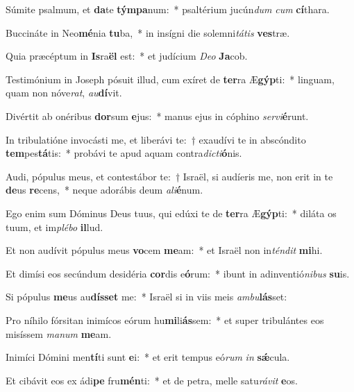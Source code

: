 \item Súmite psalmum, et \textbf{da}te \textbf{tým}\textbf{pa}num:~* psaltérium jucún\textit{dum} \textit{cum} \textbf{cí}thara.
\item Buccináte in Neo\textbf{mé}nia \textbf{tu}ba,~* in insígni die solemni\textit{tá}\textit{tis} \textbf{ves}træ.
\item Quia præcéptum in \textbf{Is}ra\textbf{ël} est:~* et judícium \textit{De}\textit{o} \textbf{Ja}cob.
\item Testimónium in Joseph pósuit illud, cum exíret de \textbf{ter}ra Æ\textbf{gýp}ti:~* linguam, quam non nóve\textit{rat}, \textit{au}\textbf{dí}vit.
\item Divértit ab onéribus \textbf{dor}sum \textbf{e}jus:~* manus ejus in cóphino \textit{ser}\textit{vi}\textbf{é}runt.
\item In tribulatióne invocásti me, et liberávi te:~† exaudívi te in abscóndito \textbf{tem}pes\textbf{tá}tis:~* probávi te apud aquam contra\textit{dic}\textit{ti}\textbf{ó}nis.
\item Audi, pópulus meus, et contestábor te:~† Israël, si audíeris me, non erit in te \textbf{de}us \textbf{re}cens,~* neque adorábis deum \textit{a}\textit{li}\textbf{é}num.
\item Ego enim sum Dóminus Deus tuus, qui edúxi te de \textbf{ter}ra Æ\textbf{gýp}ti:~* diláta os tuum, et im\textit{plé}\textit{bo} \textbf{il}lud.
\item Et non audívit pópulus meus \textbf{vo}cem \textbf{me}am:~* et Israël non in\textit{tén}\textit{dit} \textbf{mi}hi.
\item Et dimísi eos secúndum desidéria \textbf{cor}dis e\textbf{ó}rum:~* ibunt in adinventió\textit{ni}\textit{bus} \textbf{su}is.
\item Si pópulus \textbf{me}us au\textbf{dís}\textbf{set} me:~* Israël si in viis meis \textit{am}\textit{bu}\textbf{lás}set:
\item Pro níhilo fórsitan inimícos eórum hu\textbf{mi}li\textbf{ás}sem:~* et super tribulántes eos misíssem \textit{ma}\textit{num} \textbf{me}am.
\item Inimíci Dómini men\textbf{tí}ti sunt \textbf{e}i:~* et erit tempus eó\textit{rum} \textit{in} \textbf{sǽ}cula.
\item Et cibávit eos ex ádi\textbf{pe} fru\textbf{mén}ti:~* et de petra, melle satu\textit{rá}\textit{vit} \textbf{e}os.
